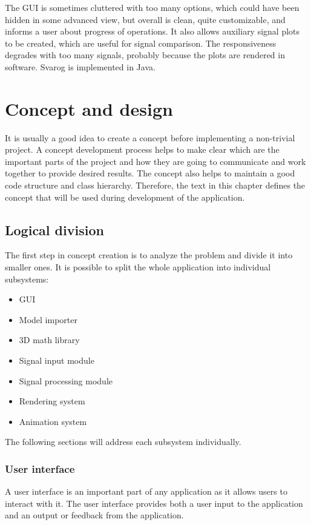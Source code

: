 The GUI is sometimes cluttered with too many options, which could have been
hidden in some advanced view, but overall is clean, quite customizable, and
informs a user about progress of operations. It also allows auxiliary
signal plots to be created, which are useful for signal comparison. The responsiveness degrades with too many signals, probably because the plots are rendered in software.
Svarog is implemented in Java.

\chapter{Concept and design} \label{concept}
It is usually a good idea to create a concept before implementing a non-trivial project. A concept development process helps to make clear which are the important parts of the project and how they are going to communicate and work together to provide desired results. The concept also helps to maintain a good code structure and class hierarchy. Therefore, the text in this chapter defines the concept that will be used during development of the application.

\section{Logical division}
The first step in concept creation is to analyze the problem and divide it into smaller ones. It is possible to split the whole application into individual subsystems:
\begin{itemize}
	\item GUI
	\item Model importer
	\item 3D math library 
	\item Signal input module
	\item Signal processing module
	\item Rendering system
	\item Animation system
\end{itemize}

The following sections will address each subsystem individually.
\subsection{User interface}
A user interface is an important part of any application as it allows users to interact with it. The user interface provides both a user input to the application and an output or feedback from the application.

